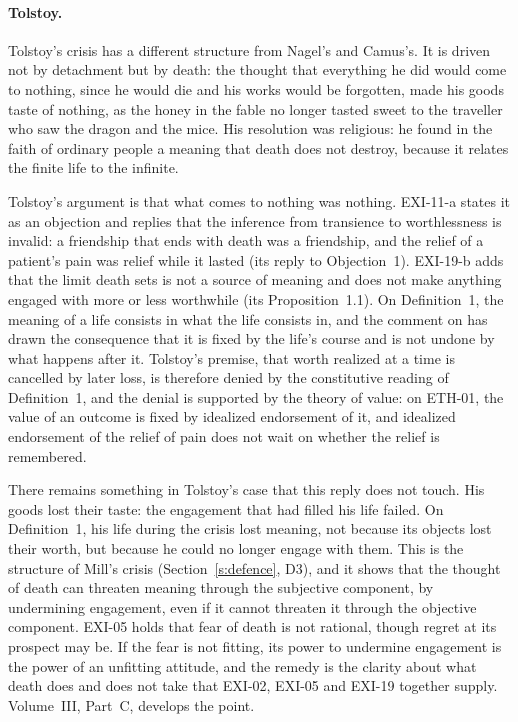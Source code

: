 \paragraph{Tolstoy.} Tolstoy's crisis \citep{Tolstoy1987} has a different structure from Nagel's and Camus's. It is driven not by detachment but by death: the thought that everything he did would come to nothing, since he would die and his works would be forgotten, made his goods taste of nothing, as the honey in the fable no longer tasted sweet to the traveller who saw the dragon and the mice. His resolution was religious: he found in the faith of ordinary people a meaning that death does not destroy, because it relates the finite life to the infinite.

Tolstoy's argument is that what comes to nothing was nothing. EXI-11-a states it as an objection and replies that the inference from transience to worthlessness is invalid: a friendship that ends with death was a friendship, and the relief of a patient's pain was relief while it lasted (its reply to Objection~1). EXI-19-b adds that the limit death sets is not a source of meaning and does not make anything engaged with more or less worthwhile (its Proposition~1.1). On Definition~1, the meaning of a life consists in what the life consists in, and the comment on  has drawn the consequence that it is fixed by the life's course and is not undone by what happens after it. Tolstoy's premise, that worth realized at a time is cancelled by later loss, is therefore denied by the constitutive reading of Definition~1, and the denial is supported by the theory of value: on ETH-01, the value of an outcome is fixed by idealized endorsement of it, and idealized endorsement of the relief of pain does not wait on whether the relief is remembered.

There remains something in Tolstoy's case that this reply does not touch. His goods lost their taste: the engagement that had filled his life failed. On Definition~1, his life during the crisis lost meaning, not because its objects lost their worth, but because he could no longer engage with them. This is the structure of Mill's crisis (Section~\ref{s:defence}, D3), and it shows that the thought of death can threaten meaning through the subjective component, by undermining engagement, even if it cannot threaten it through the objective component. EXI-05 holds that fear of death is not rational, though regret at its prospect may be. If the fear is not fitting, its power to undermine engagement is the power of an unfitting attitude, and the remedy is the clarity about what death does and does not take that EXI-02, EXI-05 and EXI-19 together supply. Volume~III, Part~C, develops the point.

